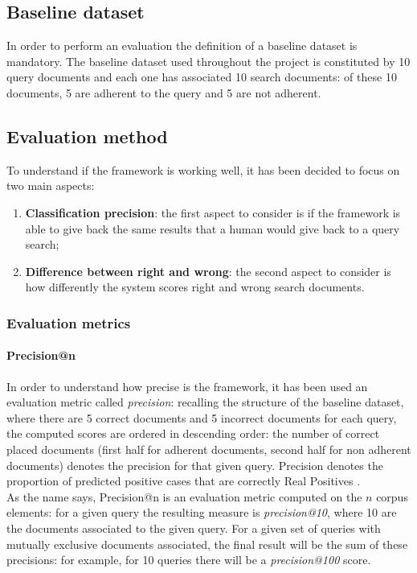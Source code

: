 \documentclass[\main/main.tex]{subfiles}
\begin{document}
\subsection{Baseline dataset}
In order to perform an evaluation the definition of a baseline dataset is mandatory. The baseline dataset used throughout the project is constituted by 10 query documents and each one has associated 10 search documents: of these 10 documents, 5 are adherent to the query and 5 are not adherent.
\subsection{Evaluation method}
To understand if the framework is working well, it has been decided to focus on two main aspects:
\begin{enumerate}
    \item \textbf{Classification precision}: the first aspect to consider is if the framework is able to give back the same results that a human would give back to a query search;
    \item \textbf{Difference between right and wrong}: the second aspect to consider is how differently the system scores right and wrong search documents.
\end{enumerate}
\subsubsection{Evaluation metrics}
\paragraph{Precision@n} In order to understand how precise is the framework, it has been used an evaluation metric called \emph{precision}: recalling the structure of the baseline dataset, where there are 5 correct documents and 5 incorrect documents for each query, the computed scores are ordered in descending order: the number of correct placed documents (first half for adherent documents, second half for non adherent documents) denotes the precision for that given query. Precision denotes the proportion of predicted positive cases that are correctly Real Positives \cite{DBLP:journals/corr/abs-2010-16061}.\\
As the name says, Precision@n is an evaluation metric computed on the $n$ corpus elements: for a given query the resulting measure is \emph{precision@10}, where 10 are the documents associated to the given query. For a given set of queries with mutually exclusive documents associated, the final result will be the sum of these precisions: for example, for 10 queries there will be a \emph{precision@100} score.
\end{document}
